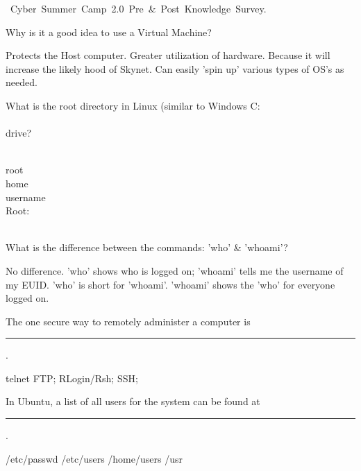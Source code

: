 \documentclass{exam}
\begin{document}
\hfill{}
\begin{center}
  \mbox{\mbox{\centering
    {\Large Cyber Summer Camp 2.0 Pre \& Post Knowledge Survey}.}}
\end{center}
\vspace{.2in}

\begin{questions}
 
  \question Why is it a good idea to use a Virtual Machine?
    \begin{choices}
      \choice Protects the Host computer.
      \choice Greater utilization of hardware.
      \choice Because it will increase the likely hood of Skynet.
      \choice Can easily 'spin up' various types of OS's as needed.
    \end{choices}
  
    \question What is the root directory in Linux (similar to Windows C:\\\\ drive?
    \begin{choices}
      \choice \\root
      \choice \\home\\username
      \choice \\
      \choice Root:\\\\ 
    \end{choices}
  
    \question What is the difference between the commands: 'who' \& 'whoami'?
    \begin{choices}
      \choice No difference.
      \choice 'who' shows who is logged on; 'whoami' tells me the username of my EUID.
      \choice 'who' is short for 'whoami'. 
      \choice 'whoami' shows the 'who' for everyone logged on.
    \end{choices}
  
  \question The one secure way to remotely administer a computer is \rule{1in}{1pt}.
    \begin{choices}
      \choice telnet
      \choice FTP; 
      \choice RLogin/Rsh;
      \choice SSH;
    \end{choices}
  
  \question In Ubuntu, a list of all users for the system can be found at \rule{1in}{1pt}. 
    \begin{choices}
      \choice /etc/passwd
      \choice /etc/users
      \choice /home/users
      \choice /usr
    \end{choices}
  

\end{questions}
\end{document}
